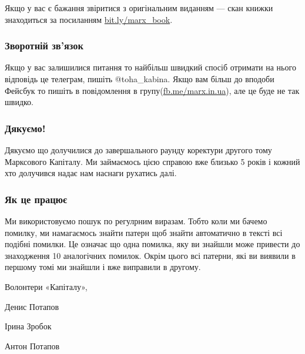 \documentclass{kapital}
\begin{document}
{  \noindent{}Якщо у вас є бажання звіритися з оригінальним виданням — скан книжки
знаходиться за посиланням \underline{bit.ly/marx\_book}.

  \subsubsection*{Зворотній зв'язок}

  Якщо у вас залишилися питання то найбільш швидкий спосіб отримати на нього відповідь це телеграм, пишіть @toha_kabina. Якщо вам більш до вподоби Фейсбук то пишіть в повідомлення в групу(\underline{fb.me/marx.in.ua}), але це буде не так швидко.

  \subsubsection*{Дякуємо!}

  Дякуємо що долучилися до завершального раунду коректури другого тому Марксового Капіталу. Ми займаємось цією справою вже близько 5 років і кожний хто долучився надає нам наснаги рухатись далі.

  \subsubsection*{Як це працює}
  Ми використовуємо пошук по регулрним виразам. Тобто коли ми бачемо помилку, ми намагаємось знайти патерн щоб знайти автоматично в тексті всі подібні помилки. Це означає що одна помилка, яку ви знайшли
  може привести до знаходження 10 аналогічних помилок. Окрім цього всі патерни, які ви виявили в першому томі ми знайшли і вже виправили в другому.


  \bigskip{}

  \noindent{}Волонтери «Капіталу»,

  \medskip{}

  \noindent{}Денис Потапов

  \noindent{}Ірина Зробок

  \noindent{}Антон Потапов
}
\end{document}
